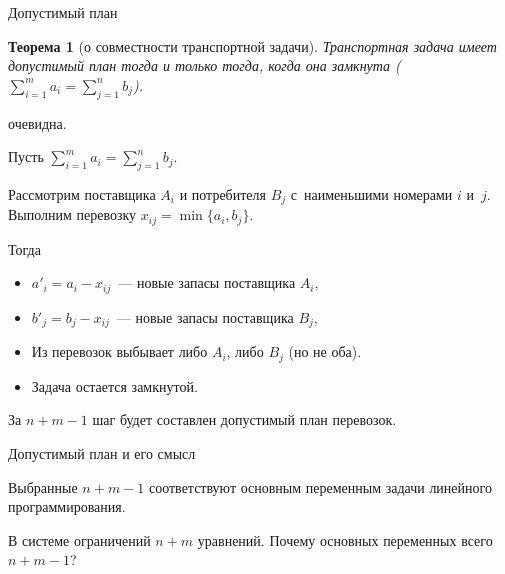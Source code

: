 \documentclass[unicode,11pt,notheorems,xcolor=table]{beamer}
\newtheorem{theorem}{Теорема}
\begin{document}
\begin{frame}{Допустимый план}
	\begin{theorem}[о совместности транспортной задачи]
		Транспортная задача имеет допустимый план тогда и только тогда, когда она замкнута ($\sum_{i=1}^{m} a_{i}= \sum_{j=1}^{n} b_j$).
	\end{theorem}
	
	\pause
	 очевидна.
	
	Пусть $\sum_{i=1}^{m} a_{i}= \sum_{j=1}^{n} b_j$.
	
	Рассмотрим поставщика $A_i$ и потребителя $B_j$ с~наименьшими номерами $i$ и~$j$. Выполним перевозку $x_{ij}=\min\{a_i,b_j\}$.
	
	Тогда 
	\begin{itemize}
		\item $a'_{i}= a_i-x_{ij}$~--- новые запасы поставщика $A_i$,
		\item $b'_{j}= b_j-x_{ij}$~--- новые запасы поставщика $B_j$,
		\item Из перевозок выбывает либо $A_i$, либо $B_j$ (но не оба).
		\item Задача остается замкнутой.
	\end{itemize}
	За  $n+m-1$ шаг будет составлен допустимый план перевозок.
\end{frame}


\begin{frame}{Допустимый план и его смысл}
	
	\begin{block}{}
		Выбранные $n+m-1$ соответствуют основным переменным задачи линейного программирования. 
	\end{block}
	
	\bigskip
	
	\begin{exampleblock}{}
		В системе ограничений $n+m$ уравнений. Почему основных переменных всего $n+m-1$?
	\end{exampleblock}
\end{frame}
\end{document}
